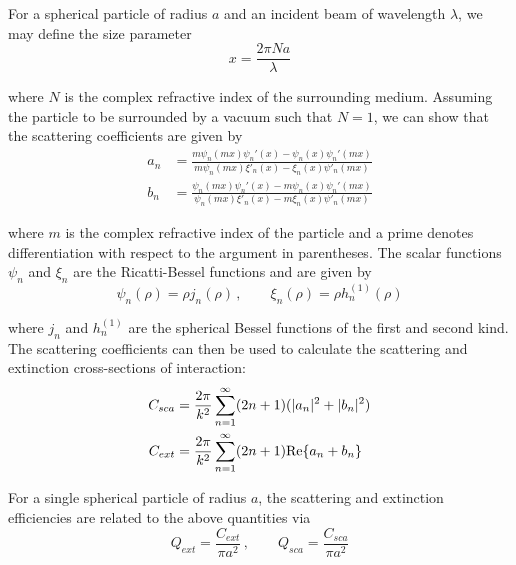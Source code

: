 For a spherical particle of radius $a$ and an incident beam of wavelength $\lambda$, we may define the size parameter
\begin{equation}
x=\frac{2\pi N a}{\lambda}
\end{equation}

\noindent where $N$ is the complex refractive index of the surrounding medium.  Assuming the particle to be surrounded by a vacuum such that $N=1$, we can show that the scattering coefficients are given by 
\begin{align}
a_n &= \frac{m\psi_n(mx)\psi_n'(x)-\psi_n(x)\psi_n'(mx)}{m\psi_n(mx)\xi'_n(x)-\xi_n(x)\psi'_n(mx)} \\[2ex]
b_n &= \frac{\psi_n(mx)\psi_n'(x)-m\psi_n(x)\psi_n'(mx)}{\psi_n(mx)\xi'_n(x)-m\xi_n(x)\psi'_n(mx)}
\end{align}


\noindent where $m$ is the complex refractive index of the particle and a prime denotes differentiation with respect to the argument in parentheses. The scalar functions $\psi_n$ and $\xi_n$ are the Ricatti-Bessel functions and are given by
\begin{equation}
\psi_n(\rho) = \rho j_n(\rho) \, , \quad \quad \xi_n(\rho)=\rho h_n^{(1)}(\rho)
\end{equation}

\noindent where $j_n$ and $h_n^{(1)}$ are the spherical Bessel functions of the first and second kind.  The scattering coefficients can then be used to calculate the scattering and extinction cross-sections of interaction:
\begin{align}
C_{sca}&=\frac{2\pi}{k^2}\sum_{n=1}^{\infty} (2n+1)(|a_n|^2+|b_n|^2) \\
C_{ext}&=\frac{2\pi}{k^2}\sum_{n=1}^{\infty} (2n+1)\textnormal{Re}\{a_n+b_n\} 
\end{align}

For a single spherical particle of radius $a$, the scattering and extinction efficiencies are related to the above quantities via
\begin{equation}
Q_{ext}=\frac{C_{ext}}{\pi a^2}\, , \quad \quad Q_{sca}=\frac{C_{sca}}{\pi a^2}
\end{equation}

